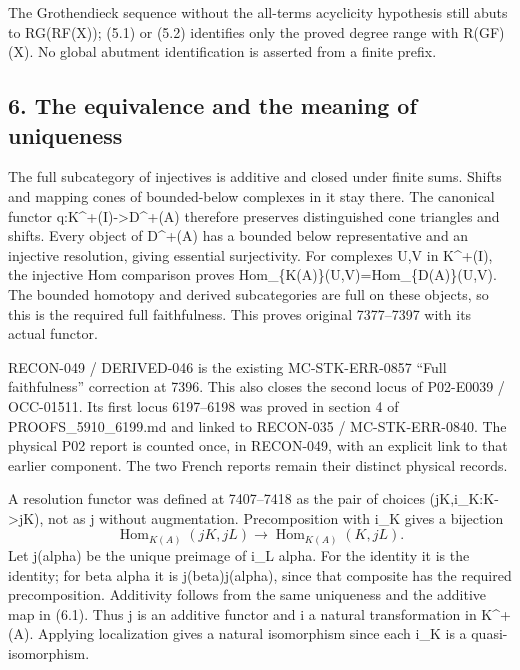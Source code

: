 \documentclass[11pt]{article}
\begin{document}
The Grothendieck sequence without the all-terms acyclicity hypothesis still abuts to RG(RF(X)\allowbreak{})\allowbreak{}; (5.1)\allowbreak{} or (5.2)\allowbreak{} identifies only the proved degree range with R(GF)\allowbreak{}(X)\allowbreak{}. No global abutment identification is asserted from a finite prefix.

\subsection{6. The equivalence and the meaning of uniqueness}\label{proofs-7096-7578-the-equivalence-and-the-meaning-of-uniqueness}

The full subcategory of injectives is additive and closed under finite sums. Shifts and mapping cones of bounded-below complexes in it stay there. The canonical functor q:\allowbreak{}K\textasciicircum{}\allowbreak{}+(I)\allowbreak{}\allowbreak{}->D\textasciicircum{}\allowbreak{}+(A)\allowbreak{} therefore preserves distinguished cone triangles and shifts. Every object of D\textasciicircum{}\allowbreak{}+(A)\allowbreak{} has a bounded below representative and an injective resolution,\allowbreak{} giving essential surjectivity. For complexes U,\allowbreak{}V in K\textasciicircum{}\allowbreak{}+(I)\allowbreak{},\allowbreak{} the injective Hom comparison proves Hom\_\allowbreak{}\{K(A)\allowbreak{}\}(U,\allowbreak{}V)\allowbreak{}\allowbreak{}=Hom\_\allowbreak{}\{D(A)\allowbreak{}\}(U,\allowbreak{}V)\allowbreak{}. The bounded homotopy and derived subcategories are full on these objects,\allowbreak{} so this is the required full faithfulness. This proves original 7377–\allowbreak{}7397 with its actual functor.

RECON-049 /\allowbreak{} DERIVED-046 is the existing MC-STK-ERR-0857 ``Full faithfulness'' correction at 7396. This also closes the second locus of P02-E0039 /\allowbreak{} OCC-01511. Its first locus 6197–\allowbreak{}6198 was proved in section 4 of PROOFS\_\allowbreak{}5910\_\allowbreak{}6199.md and linked to RECON-035 /\allowbreak{} MC-STK-ERR-0840. The physical P02 report is counted once,\allowbreak{} in RECON-049,\allowbreak{} with an explicit link to that earlier component. The two French reports remain their distinct physical records.

A resolution functor was defined at 7407–\allowbreak{}7418 as the pair of choices (jK,\allowbreak{}i\_\allowbreak{}K:\allowbreak{}K\allowbreak{}->jK)\allowbreak{},\allowbreak{} not as j without augmentation. Precomposition with i\_\allowbreak{}K gives a bijection \[
 \operatorname{Hom}_{K(A)}(jK,jL)
       \longrightarrow\operatorname{Hom}_{K(A)}(K,jL).
                                                               \tag{6.1}
\] Let j(alpha)\allowbreak{} be the unique preimage of i\_\allowbreak{}L alpha. For the identity it is the identity; for beta alpha it is j(beta)\allowbreak{}j(alpha)\allowbreak{},\allowbreak{} since that composite has the required precomposition. Additivity follows from the same uniqueness and the additive map in (6.1)\allowbreak{}. Thus j is an additive functor and i a natural transformation in K\textasciicircum{}\allowbreak{}+(A)\allowbreak{}. Applying localization gives a natural isomorphism since each i\_\allowbreak{}K is a quasi-isomorphism.
\end{document}
